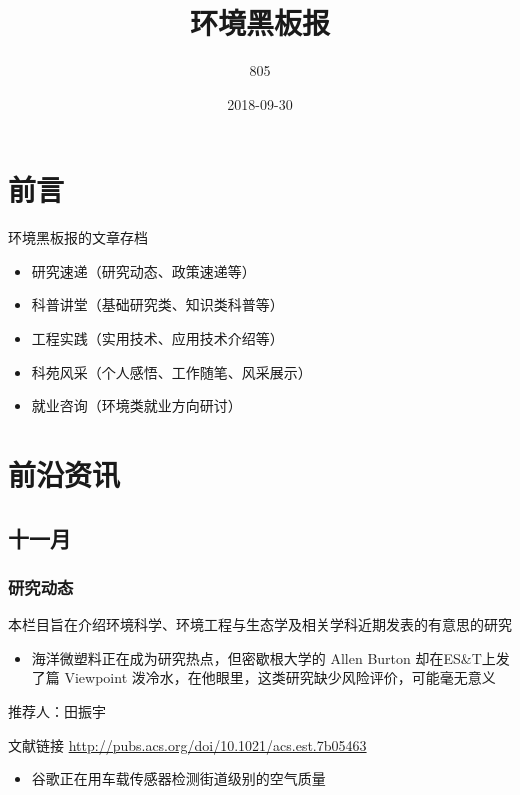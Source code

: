 \documentclass[]{book}
\title{环境黑板报}
\author{805}
\date{2018-09-30}
\providecommand{\tightlist}{%
  \setlength{\itemsep}{0pt}\setlength{\parskip}{0pt}}
\begin{document}
\maketitle

{
\setcounter{tocdepth}{1}
\tableofcontents
}
\chapter{前言}

环境黑板报的文章存档

\begin{itemize}
\item
  研究速递（研究动态、政策速递等）
\item
  科普讲堂（基础研究类、知识类科普等）
\item
  工程实践（实用技术、应用技术介绍等）
\item
  科苑风采（个人感悟、工作随笔、风采展示）
\item
  就业咨询（环境类就业方向研讨）
\end{itemize}

\chapter{前沿资讯}

\section*{十一月}

\subsection*{研究动态}

本栏目旨在介绍环境科学、环境工程与生态学及相关学科近期发表的有意思的研究

\begin{itemize}
\tightlist
\item
  海洋微塑料正在成为研究热点，但密歇根大学的 Allen Burton
  却在ES\&T上发了篇 Viewpoint
  泼冷水，在他眼里，这类研究缺少风险评价，可能毫无意义
\end{itemize}

推荐人：田振宇

文献链接 \url{http://pubs.acs.org/doi/10.1021/acs.est.7b05463}

\begin{itemize}
\tightlist
\item
  谷歌正在用车载传感器检测街道级别的空气质量
\end{itemize}
\end{document}
